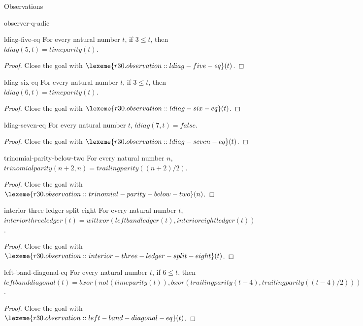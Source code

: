 \begin{lexlean}{Observations}
\begin{section}{observer-q-adic}
\begin{theorem}{ldiag-five-eq}
For every natural number \(t\), if \(3 ≤ t\), then \(ldiag(5, t) = timeparity(t)\).
\begin{proof}
Close the goal with \(\lexeme{r30.observation::ldiag-five-eq}(t)\).
\end{proof}
\end{theorem}

\begin{theorem}{ldiag-six-eq}
For every natural number \(t\), if \(3 ≤ t\), then \(ldiag(6, t) = timeparity(t)\).
\begin{proof}
Close the goal with \(\lexeme{r30.observation::ldiag-six-eq}(t)\).
\end{proof}
\end{theorem}

\begin{theorem}{ldiag-seven-eq}
For every natural number \(t\), \(ldiag(7, t) = false\).
\begin{proof}
Close the goal with \(\lexeme{r30.observation::ldiag-seven-eq}(t)\).
\end{proof}
\end{theorem}

\begin{theorem}{trinomial-parity-below-two}
For every natural number \(n\), \(trinomialparity(n + 2, n) = trailingparity((n + 2) / 2)\).
\begin{proof}
Close the goal with \(\lexeme{r30.observation::trinomial-parity-below-two}(n)\).
\end{proof}
\end{theorem}

\begin{theorem}{interior-three-ledger-split-eight}
For every natural number \(t\), \(interiorthreeledger(t) = wittxor(leftbandledger(t), interioreightledger(t))\).
\begin{proof}
Close the goal with \(\lexeme{r30.observation::interior-three-ledger-split-eight}(t)\).
\end{proof}
\end{theorem}

\begin{theorem}{left-band-diagonal-eq}
For every natural number \(t\), if \(6 ≤ t\), then \(leftbanddiagonal(t) = bxor(not(timeparity(t)), bxor(trailingparity(t - 4), trailingparity((t - 4) / 2)))\).
\begin{proof}
Close the goal with \(\lexeme{r30.observation::left-band-diagonal-eq}(t)\).
\end{proof}
\end{theorem}


\end{section}
\end{lexlean}
